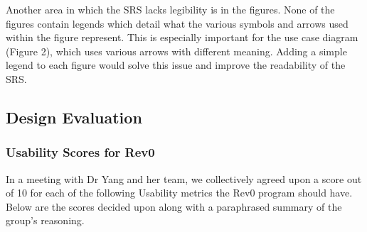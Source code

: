 \documentclass[12pt, titlepage]{article}
\begin{document}
Another area in which the SRS lacks legibility is in the figures. None of the figures contain legends which detail what the various symbols and arrows used within the figure represent. This is especially important for the use case diagram (Figure 2), which uses various arrows with different meaning. Adding a simple legend to each figure would solve this issue and improve the readability of the SRS.

\subsection{Design Evaluation}
\subsubsection{Usability Scores for Rev0} In a meeting with Dr Yang and her team, we collectively agreed upon a score out of 10 for each of the following Usability metrics 
the Rev0 program should have. Below are the scores decided upon along with a paraphrased summary of the group's reasoning.\\
\end{document}
